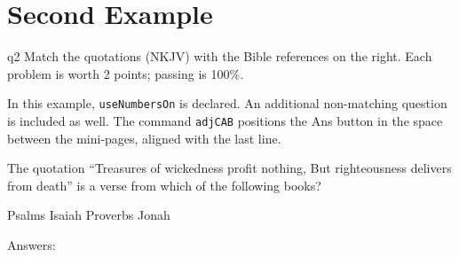 \documentclass[11pt]{article}
\def\cs#1{\texttt{\eqbs#1}}
\begin{document}
\section*{Second Example}

\begin{quiz*}{q2}
Match the quotations (\textsf{NKJV)} with the Bible references on the right.
Each problem is worth 2 points; passing is 100\%.

In this example, \cs{useNumbersOn} is declared. An additional non-matching
question is included as well. The command \cs{adjCAB} positions the
\textsf{Ans} button in the space between the mini-pages, aligned with the
last line.

\useMCCircles

\noindent
\begin{minipage}[t]{.75\linewidth-\eflength}
\useNumbersOn
\adjCAB{\makebox[0pt][l]{\enspace#2\enspace}}
\begin{questions}
\begin{BblPsg}
  \item{}
  \item{}
  \item{}
\end{BblPsg}
\item{} The quotation ``Treasures of wickedness profit nothing, But
    righteousness delivers from death'' is a verse from which of the
    following books?
\begin{answers}{4}
  \bChoices
     Psalms\eAns
     Isaiah\eAns
     Proverbs\eAns
     Jonah\eAns
    \eChoices
\end{answers}
\end{questions}
\end{minipage}
\hfill
\begin{minipage}[t]{.25\linewidth}
\begin{questions}[itemsep={0pt},labelwidth={1em}]
\begin{BblVrs}
  \item{}
  \item{}
  \item{}
  \item{}
  \item{}
  \item{}
\end{BblVrs}
\end{questions}
\end{minipage}\hfil
\par\medskip
\end{quiz*}\quad\PointsField\currQuiz\olBdry\CorrButton\currQuiz\cgBdry[6pt]
Answers: 
\end{document}
